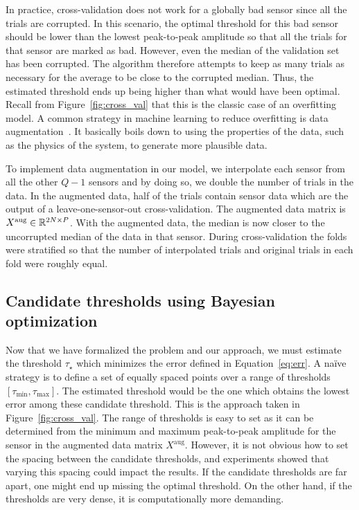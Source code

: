 In practice, cross-validation does not work for a globally bad sensor since all the trials are corrupted. In this scenario, the optimal threshold for this bad sensor should be lower than the lowest peak-to-peak amplitude so that all the trials for that sensor are marked as bad. However, even the median of the validation set has been corrupted. The algorithm therefore attempts to keep as many trials as necessary for the average to be close to the corrupted median. Thus, the estimated threshold ends up being higher than what would have been optimal. Recall from Figure~\ref{fig:cross_val} that this is the classic case of an overfitting model. A common strategy in machine learning to reduce overfitting is data augmentation~\citep{krizhevsky2012imagenet}. It basically boils down to using the properties of the data, such as the physics of the system, to generate more plausible data.

To implement data augmentation in our model, we interpolate each sensor from all the other $Q-1$ sensors and by doing so, we double the number of trials in the data. In the augmented data, half of the trials contain sensor data which are the output of a leave-one-sensor-out cross-validation. The augmented data matrix is $X^{\textrm{aug}} \in \mathbb{R}^{2N \times P}$. With the augmented data, the median is now closer to the uncorrupted median of the data in that sensor. During cross-validation the folds were stratified so that the number of interpolated trials and original trials in each fold were roughly equal.

\subsection{Candidate thresholds using Bayesian optimization}
\label{sec:bayesian_opt}
Now that we have formalized the problem and our approach, we must estimate the threshold $\tau_{\star}$ which minimizes the error defined in Equation~\eqref{eq:err}. A na\"ive strategy is to define a set of equally spaced points over a range of thresholds $[\tau_{\min}, \tau_{\max}]$. The estimated threshold would be the one which obtains the lowest error among these candidate threshold. This is the approach taken in Figure~\ref{fig:cross_val}. The range of thresholds is easy to set as it can be determined from the minimum and maximum peak-to-peak amplitude for the sensor in the augmented data matrix $X^{\textrm{aug}}$. However, it is not obvious how to set the spacing between the candidate thresholds, and experiments showed that varying this spacing could impact the results. If the candidate thresholds are far apart, one might end up missing the optimal threshold. On the other hand, if the thresholds are very dense, it is computationally more demanding.

